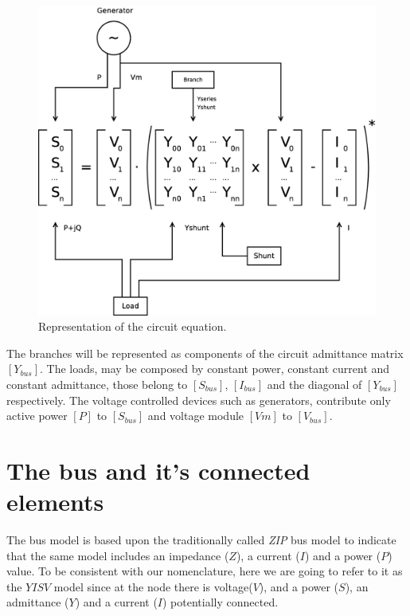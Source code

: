 \documentclass[nols,a4paper,twoside,notoc,fleqn]{tufte-book}
\begin{document}
\begin{figure}[h!]
	\includegraphics[width=0.9\linewidth]{img/CircuitEquation.eps}
	\caption{Representation of the circuit equation.}
	\label{fig:circuit_equation}
\end{figure}

The branches will be represented as components of the circuit admittance matrix $[Y_{bus}]$. The loads, may be composed by constant power, constant current and constant admittance, those belong to $[S_{bus}]$, $[I_{bus}]$ and the diagonal of $[Y_{bus}]$ respectively. The voltage controlled devices such as generators, contribute only active power $[P]$ to $[S_{bus}]$ and voltage module $[Vm]$ to $[V_{bus}]$.

\section{The bus and it's connected elements}

The bus model is based upon the traditionally called \textit{ZIP} bus model to indicate that the same model includes an impedance ($Z$), a current ($I$) and a power ($P$) value. To be consistent with our nomenclature, here we are going to refer to it as the $YISV$ model since at the node there is voltage($V$), and a power ($S$), an admittance ($Y$) and a current ($I$) potentially connected.


\end{document}
